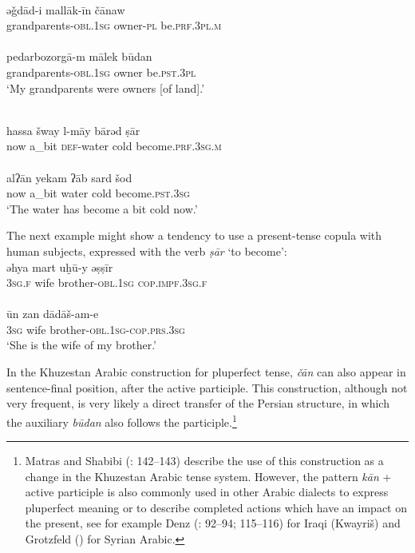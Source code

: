 \documentclass[output=paper,nonflat]{langsci/langscibook}
\begin{document}
\ea
{}\\
\gll əǧdād-i mallāk-īn čānaw\\
     grandparents-\textsc{obl.1sg} owner-\textsc{pl} be.\textsc{prf.3pl.m}\\
 
\\
\gll pedarbozorgā-m mālek būdan\\
     grandparents-\textsc{obl.1sg} owner be.\textsc{pst.3pl}\\
\glt ‘My grandparents were owners [of land].’
\z\z

\ea\label{cold}
\\
\gll hassa šway l-māy bārəd ṣār\\
     now a\_bit \textsc{def}{}-water cold become.\textsc{prf.3sg.m}\\
 
\\
\gll alʔān yekam ʔāb sard šod\\
     now a\_bit water cold become.\textsc{pst}.\textsc{3sg}\\
\glt ‘The water has become a bit cold now.’
\z\z

The next example might show a tendency to use a present-tense copula with human subjects, expressed with the verb \textit{ṣār} ‘to become’: 
\ea
{}\\
\gll əhya mart uḫū-y əṣṣīr\\
     3\textsc{sg.f} wife brother-\textsc{obl.1sg} \textsc{cop.impf.3sg.f}\\
 
\\
\gll ūn zan dādāš-am-e\\
     3\textsc{sg} wife brother-\textsc{obl.1sg}-\textsc{cop.prs.3sg}\\
\glt ‘She is the wife of my brother.’
\z\z


In the Khuzestan Arabic construction for pluperfect tense, \textit{čān} can also appear in sentence-final position, after the active participle. This construction, although not very frequent, is very likely a direct transfer of the Persian structure, in which the auxiliary \textit{būdan} also follows the participle.\footnote{Matras and Shabibi (\citeyear{MatrasShabibi2007}: 142–143) describe the use of this construction as a change in the Khuzestan Arabic tense system. However, the pattern \textit{kān} + active participle is also commonly used in other Arabic dialects to express pluperfect meaning or to describe completed actions which have an impact on the present, see for example Denz (\citeyear{Denz1971}: 92–94; 115–116) for Iraqi (Kwayriš) and Grotzfeld (\citeyear[88]{Grotzfeld1965}) for Syrian Arabic.} 
\end{document}
